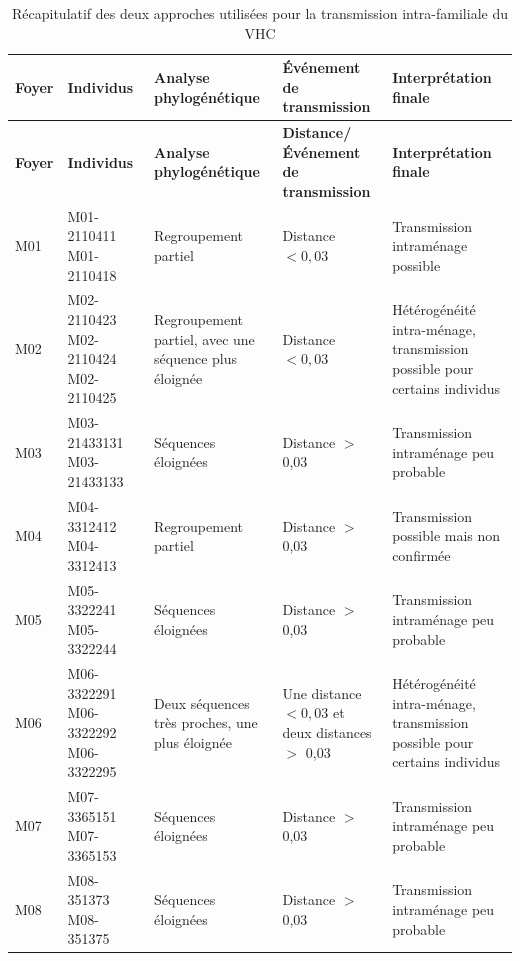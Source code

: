 \documentclass[a4paper,12pt]{article}
\begin{document}
\begin{longtable}{>{\centering\arraybackslash}p{1.2cm} 
                  p{3cm} 
                  p{5cm} 
                  p{3cm} 
                  p{4cm}}

\caption{Récapitulatif des deux approches utilisées pour la transmission intra-familiale du VHC}
\label{tab:phylo_foyers}\\

\hline
\textbf{Foyer} & 
\textbf{Individus} & 
\textbf{Analyse phylogénétique} & 
\textbf{Événement de transmission} & 
\textbf{Interprétation finale} \\
\hline
\endfirsthead

\hline
\textbf{Foyer} & 
\textbf{Individus} & 
\textbf{Analyse phylogénétique} & 
\textbf{Distance/ Événement de transmission} & 
\textbf{Interprétation finale} \\
\hline
\endhead


\rowcolor{blue!10}
M01 & 
M01-2110411  M01-2110418 & 
Regroupement partiel & 
Distance $<0,03$ & 
Transmission intraménage possible \\


\rowcolor{green!10}
M02 & 
M02-2110423  M02-2110424  M02-2110425 & 
Regroupement partiel, avec une séquence plus éloignée & 
Distance $<0,03$ & 
Hétérogénéité intra-ménage, transmission possible pour certains individus \\


\rowcolor{yellow!20}
M03 & 
M03-21433131  M03-21433133 & 
Séquences éloignées & 
Distance $>$ 0,03 & 
Transmission intraménage peu probable \\


\rowcolor{orange!10}
M04 & 
M04-3312412  M04-3312413 & 
Regroupement partiel & 
Distance $>$ 0,03 & 
Transmission possible mais non confirmée \\


\rowcolor{red!20}
M05 & 
M05-3322241  M05-3322244 & 
Séquences éloignées & 
Distance $>$ 0,03 & 
Transmission intraménage peu probable \\


\rowcolor{purple!10}
M06 & 
M06-3322291  M06-3322292  M06-3322295 & 
Deux séquences très proches, une plus éloignée & 
Une distance $<0,03$ et deux distances $>$  0,03 & 
Hétérogénéité intra-ménage, transmission possible pour certains individus \\


\rowcolor{cyan!10}
M07 & 
M07-3365151  M07-3365153 & 
Séquences éloignées & 
Distance $>$ 0,03 & 
Transmission intraménage peu probable \\


\rowcolor{pink!20}
M08 & 
M08-351373  M08-351375 & 
Séquences éloignées & 
Distance $>$ 0,03 & 
Transmission intraménage peu probable \\


\hline

\end{longtable}
\end{document}
